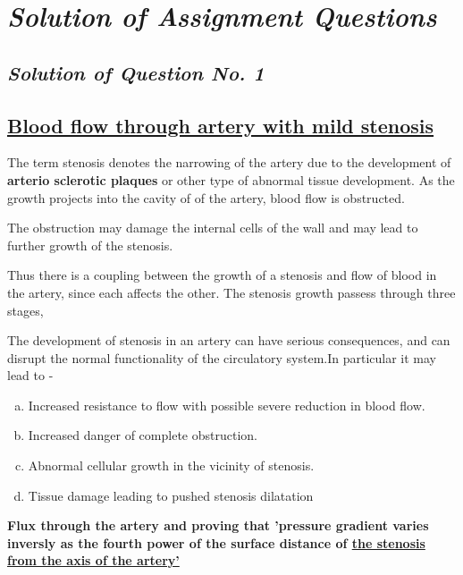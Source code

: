 \documentclass[12pt, a4paper]{article} %
\begin{document}
\pagebreak

\section{\slshape Solution of Assignment Questions}

\subsection{\slshape Solution of Question No. 1}

\subsection*{\underline{Blood flow through artery with mild stenosis}}

The term stenosis denotes the narrowing of the artery due to the development of {\bf arterio sclerotic plaques} or other type of abnormal tissue development. As the growth projects into the cavity of of the artery, blood flow is obstructed.

The obstruction may damage the internal cells of the wall and may lead to further growth of the stenosis.

Thus there is a coupling between the growth of a stenosis and flow of blood in the artery, since each affects the other. The stenosis growth passess through three stages,
\vspace*{1cm}
\begin{center}
    \def \svgwidth{15cm}
    
\end{center}

The development of stenosis in an artery can have serious consequences, and can disrupt the normal functionality of the circulatory system.In particular it may lead to -
\begin{enumerate}[(a)]
    \item Increased resistance to flow with possible severe reduction in blood flow.
    \item Increased danger of complete obstruction.
    \item Abnormal cellular growth in the vicinity of stenosis.
    \item Tissue damage leading to pushed stenosis dilatation
\end{enumerate}

\large{{\bf Flux through the artery and proving that 'pressure gradient varies inversly as the fourth power of the surface distance of \underline{the stenosis from the axis of the artery' \hspace*{6cm}}}}
\end{document}
